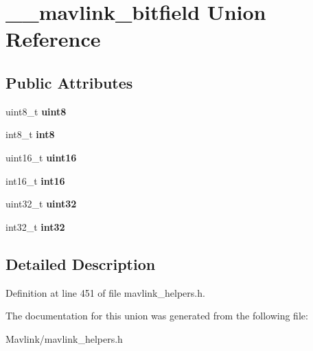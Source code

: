 \hypertarget{union____mavlink__bitfield}{}\section{\+\_\+\+\_\+mavlink\+\_\+bitfield Union Reference}
\label{union____mavlink__bitfield}
\subsection*{Public Attributes}
\begin{DoxyCompactItemize}
\item 
\hypertarget{union____mavlink__bitfield_ade669a5f63c53f0d61f636eff94417c0}{}\label{union____mavlink__bitfield_ade669a5f63c53f0d61f636eff94417c0} 
uint8\+\_\+t {\bfseries uint8}
\item 
\hypertarget{union____mavlink__bitfield_a50a846d427d7a1d7dc79235c87597622}{}\label{union____mavlink__bitfield_a50a846d427d7a1d7dc79235c87597622} 
int8\+\_\+t {\bfseries int8}
\item 
\hypertarget{union____mavlink__bitfield_a0ca76ce4a09ee26387e50b6702c17894}{}\label{union____mavlink__bitfield_a0ca76ce4a09ee26387e50b6702c17894} 
uint16\+\_\+t {\bfseries uint16}
\item 
\hypertarget{union____mavlink__bitfield_a99cd7f966d8a59b29d05197b39c5b229}{}\label{union____mavlink__bitfield_a99cd7f966d8a59b29d05197b39c5b229} 
int16\+\_\+t {\bfseries int16}
\item 
\hypertarget{union____mavlink__bitfield_ab43ed56310c2d778ebaa7a5a21cb6587}{}\label{union____mavlink__bitfield_ab43ed56310c2d778ebaa7a5a21cb6587} 
uint32\+\_\+t {\bfseries uint32}
\item 
\hypertarget{union____mavlink__bitfield_a07bd702e8b91679a25e632ad90d0a1ec}{}\label{union____mavlink__bitfield_a07bd702e8b91679a25e632ad90d0a1ec} 
int32\+\_\+t {\bfseries int32}
\end{DoxyCompactItemize}


\subsection{Detailed Description}


Definition at line 451 of file mavlink\+\_\+helpers.\+h.



The documentation for this union was generated from the following file\+:\begin{DoxyCompactItemize}
\item 
Mavlink/mavlink\+\_\+helpers.\+h\end{DoxyCompactItemize}

